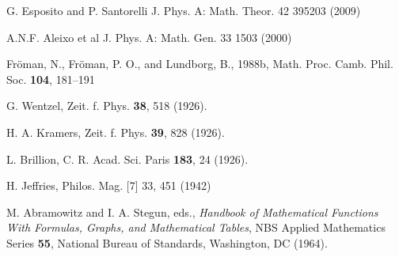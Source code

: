 \documentclass[12pt]{iopart}
\begin{document}
\begin{thebibliography}{30}
 G. Esposito and P. Santorelli J. Phys. A: Math. Theor. 42 395203 (2009)

 A.N.F. Aleixo et al J. Phys. A: Math. Gen. 33 1503 (2000)

 Fr\"oman, N., Fr\"oman, P. O., and Lundborg, B., 1988b, 
Math. Proc. Camb. Phil. Soc. \textbf{104}, 181–191

 G. Wentzel, Zeit. f. Phys. \textbf{38}, 518 (1926).

 H. A. Kramers, Zeit. f. Phys. \textbf{39}, 828 (1926).

 L. Brillion, C. R. Acad. Sci. Paris \textbf{183}, 24 (1926).

 H. Jeffries, Philos. Mag. [7] 33, 451 (1942)

 M. Abramowitz and I. A. Stegun, eds., 
{\it Handbook of Mathematical Functions With Formulas, Graphs, and Mathematical Tables}, 
NBS Applied Mathematics Series \textbf{55}, National Bureau of Standards, Washington, DC (1964).

\end{thebibliography}
\end{document}
